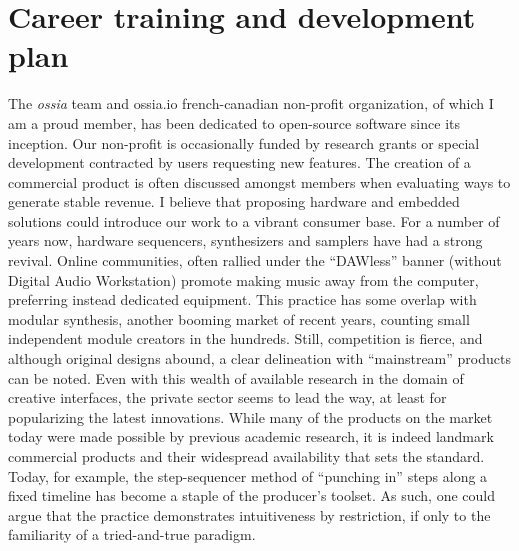\documentclass[journal,onecolumn]{IEEEtran}
\begin{document}
\section{Career training and development plan} %
The \textit{ossia} team and ossia.io french-canadian non-profit organization, of which I am a proud member, has been dedicated to open-source software since its inception. Our non-profit is occasionally funded by research grants or special development contracted by users requesting new features. The creation of a commercial product is often discussed amongst members when evaluating ways to generate stable revenue. I believe that proposing hardware and embedded solutions could introduce our work to a vibrant consumer base. For a number of years now, hardware sequencers, synthesizers and samplers have had a strong revival. Online communities, often rallied under the ``DAWless'' banner (without Digital Audio Workstation) promote making music away from the computer, preferring instead dedicated equipment. This practice has some overlap with modular synthesis, another booming market of recent years, counting small independent module creators in the hundreds. Still, competition is fierce, and although original designs abound, a clear delineation with ``mainstream'' products can be noted. Even with this wealth of available research in the domain of creative interfaces, the private sector seems to lead the way, at least for popularizing the latest innovations. While many of the products on the market today were made possible by previous academic research, it is indeed landmark commercial products and their widespread availability that sets the standard. Today, for example, the step-sequencer method of ``punching in'' steps along a fixed timeline has become a staple of the producer's toolset. As such, one could argue that the practice demonstrates intuitiveness by restriction, if only to the familiarity of a tried-and-true paradigm. 
\end{document}
